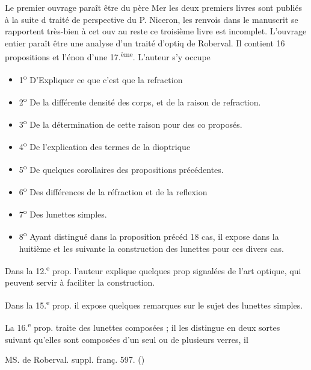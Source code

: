 \documentclass[11pt,a4paper]{article}
\begin{document}
Le premier ouvrage paraît être du père Mer\ill{} les deux premiers livres sont publiés à la suite d\ill{} traité de perspective du P. Niceron, les renvois \ill{} dans le manuscrit se rapportent très-bien à cet ouv au reste ce troisième livre est incomplet. L'ouvrage entier paraît être une analyse d'un traité d'optiq de Roberval. Il contient 16 propositions et l'énon d'une 17.\textsuperscript{ème}. L'auteur s'y occupe
\begin{itemize}
  \item[page.11] 1\textsuperscript{o} D'Expliquer ce que c'est que la refraction
  \item[16] 2\textsuperscript{o} De la différente densité des corps, et de la raison de refraction.
  \item[21] 3\textsuperscript{o} De la détermination de cette raison pour des co proposés.
  \item[25.] 4\textsuperscript{o} De l'explication des termes de la dioptrique
  \item[30] 5\textsuperscript{o} De quelques corollaires des propositions précédentes.
  \item[51] 6\textsuperscript{o} Des différences de la réfraction et de la reflexion
  \item[71] 7\textsuperscript{o} Des lunettes simples.
  \item[77] 8\textsuperscript{o} Ayant distingué dans la proposition précéd 18 cas, il expose dans la huitième et les suivante la construction des lunettes pour ces divers cas.
\end{itemize}

Dans la 12.\textsuperscript{e} prop. l'auteur explique quelques prop\ill{} signalées de l'art optique, qui peuvent servir à \ill{} faciliter la construction.

Dans la 15.\textsuperscript{e} prop. il expose quelques remarques \ill{} sur le sujet des lunettes simples.

La 16.\textsuperscript{e} prop. traite des lunettes composées ; il les distingue en deux sortes suivant qu'elles sont composées d'un seul ou de plusieurs verres, il \ill{}

MS. de Roberval. suppl. franç. 597. ()
\end{document}

